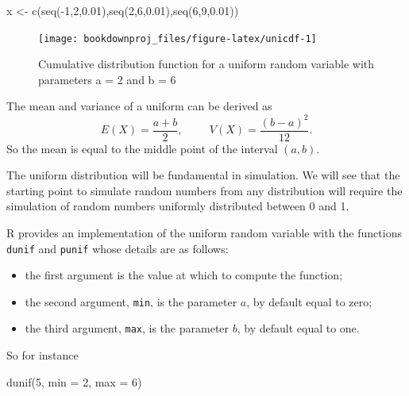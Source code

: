 \documentclass[
]{book}
\newenvironment{Shaded}{\begin{snugshade}}{\end{snugshade}}
\newcommand{\AttributeTok}[1]{\textcolor[rgb]{0.77,0.63,0.00}{#1}}
\newcommand{\DecValTok}[1]{\textcolor[rgb]{0.00,0.00,0.81}{#1}}
\newcommand{\FloatTok}[1]{\textcolor[rgb]{0.00,0.00,0.81}{#1}}
\newcommand{\FunctionTok}[1]{\textcolor[rgb]{0.00,0.00,0.00}{#1}}
\newcommand{\NormalTok}[1]{#1}
\newcommand{\OtherTok}[1]{\textcolor[rgb]{0.56,0.35,0.01}{#1}}
\newcommand{\SpecialCharTok}[1]{\textcolor[rgb]{0.00,0.00,0.00}{#1}}
\theoremstyle{definition}
\theoremstyle{definition}
\theoremstyle{definition}
\theoremstyle{definition}
\theoremstyle{remark}
\begin{document}
\begin{Shaded}
\begin{Highlighting}[]
\NormalTok{x }\OtherTok{\textless{}{-}} \FunctionTok{c}\NormalTok{(}\FunctionTok{seq}\NormalTok{(}\SpecialCharTok{{-}}\DecValTok{1}\NormalTok{,}\DecValTok{2}\NormalTok{,}\FloatTok{0.01}\NormalTok{),}\FunctionTok{seq}\NormalTok{(}\DecValTok{2}\NormalTok{,}\DecValTok{6}\NormalTok{,}\FloatTok{0.01}\NormalTok{),}\FunctionTok{seq}\NormalTok{(}\DecValTok{6}\NormalTok{,}\DecValTok{9}\NormalTok{,}\FloatTok{0.01}\NormalTok{))}
\end{Highlighting}
\end{Shaded}

\begin{figure}

{\centering \texttt{[image: bookdownproj\_files/figure-latex/unicdf-1]} 

}

\caption{Cumulative distribution function for a uniform random variable with parameters a = 2 and b = 6}\label{fig:unicdf}
\end{figure}

The mean and variance of a uniform can be derived as
\[
E(X)=\frac{a+b}{2}, \hspace{1cm} V(X)=\frac{(b-a)^2}{12}.
\]
So the mean is equal to the middle point of the interval \((a,b)\).

The uniform distribution will be fundamental in simulation. We will see that the starting point to simulate random numbers from any distribution will require the simulation of random numbers uniformly distributed between 0 and 1.

R provides an implementation of the uniform random variable with the functions \texttt{dunif} and \texttt{punif} whose details are as follows:

\begin{itemize}
\item
  the first argument is the value at which to compute the function;
\item
  the second argument, \texttt{min}, is the parameter \(a\), by default equal to zero;
\item
  the third argument, \texttt{max}, is the parameter \(b\), by default equal to one.
\end{itemize}

So for instance

\begin{Shaded}
\begin{Highlighting}[]
\FunctionTok{dunif}\NormalTok{(}\DecValTok{5}\NormalTok{, }\AttributeTok{min =} \DecValTok{2}\NormalTok{, }\AttributeTok{max =} \DecValTok{6}\NormalTok{)}
\end{Highlighting}
\end{Shaded}
\end{document}
